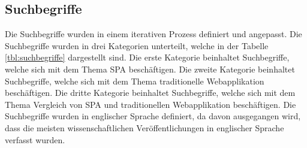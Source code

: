 \subsection{Suchbegriffe}
Die Suchbegriffe wurden in einem iterativen Prozess definiert und angepasst.
Die Suchbegriffe wurden in drei Kategorien unterteilt, welche in der Tabelle \ref*{tbl:suchbegriffe} dargestellt sind.
Die erste Kategorie beinhaltet Suchbegriffe, welche sich mit dem Thema \ac{SPA} beschäftigen.
Die zweite Kategorie beinhaltet Suchbegriffe, welche sich mit dem Thema traditionelle Webapplikation beschäftigen.
Die dritte Kategorie beinhaltet Suchbegriffe, welche sich mit dem Thema Vergleich von \ac{SPA} und traditionellen Webapplikation beschäftigen.
Die Suchbegriffe wurden in englischer Sprache definiert, da davon ausgegangen wird, dass die meisten wissenschaftlichen Veröffentlichungen in englischer Sprache verfasst wurden.


